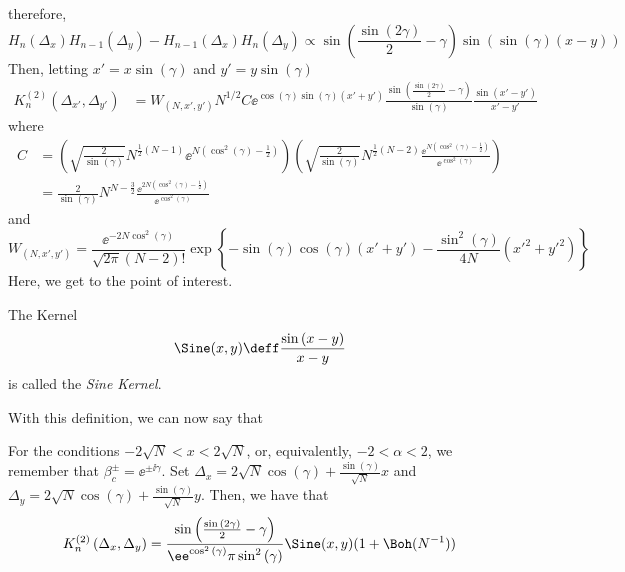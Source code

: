 {\begin{equation}
\end{equation}
therefore,
\begin{equation}
	H_n(\Delta_x)H_{n-1}(\Delta_y) - H_{n-1}(\Delta_x)H_n(\Delta_y) \propto \sin{\left(\frac{\sin{(2\gamma)}}{2}-\gamma\right)} \sin{\left( \sin{(\gamma)}(x - y) \right)}
\end{equation}
Then, letting $x' = x \sin{(\gamma)}$ and $y' = y \sin{(\gamma)}$
\begin{align}
	K_n^{(2)}(\Delta_{x'},\Delta_{y'}) & = W_{(N,x',y')} N^{1/2} C \ee^{\cos{(\gamma)}\sin{(\gamma)}(x' + y')} \frac{\sin{\left(\frac{\sin{(2\gamma)}}{2}-\gamma\right)} }{\sin{(\gamma)}}\frac{\sin{(x' - y')}}{x'-y'}
\end{align}
where
\begin{align}
	C & = \left(\sqrt{\frac{2}{\sin{(\gamma)}}}
	N^{\frac{1}{2}(N-1)}
	\ee^{N\left(\cos^2{(\gamma)} - \frac{1}{2} \right)} \right) 
	\left( \sqrt{\frac{2}{\sin{(\gamma)}}} 
	N^{\frac{1}{2}(N-2)}
	\frac{\ee^{N\left(\cos^2{(\gamma)} - \frac{1}{2} \right)}}{\ee^{\cos^2{(\gamma)} }}
	\right) \\
	& = \frac{2}{\sin{(\gamma)}}
	N^{N - \frac{3}{2}}
	\frac{\ee^{2N\left(\cos^2{(\gamma)} - \frac{1}{2} \right)}}{\ee^{\cos^2{(\gamma)}}}
\end{align}
and
\begin{equation}
	W_{(N,x',y')} = \frac{\ee^{-2N\cos^2{(\gamma)}}}{\sqrt{2\pi} (N-2)!}
	\exp{\left\{-\sin{(\gamma)}\cos{(\gamma)} (x'+y') - \frac{\sin^2{(\gamma)}}{4N} (x'^2 + y'^2) \right\}} 
\end{equation}
Here, we get to the point of interest. 
\begin{definicao}
	The Kernel
	\begin{equation}
		\Sine(x, y) \deff \frac{\sin{(x  -y)}}{x - y}
	\end{equation}
	is called the \textit{Sine Kernel}.
\end{definicao}
With this definition, we can now say that 
\begin{teorema}
	For the conditions $-2\sqrt{N} < x < 2\sqrt{N}$, or, equivalently, $-2 < \alpha < 2$, we remember that $\beta_c^\pm = \ee^{\pm \ii \gamma}$. Set $\Delta_x = 2\sqrt{N}\cos(\gamma) + \frac{\sin{(\gamma)}}{\sqrt{N}} x$ and $\Delta_y = 2\sqrt{N}\cos(\gamma) + \frac{\sin{(\gamma)}}{\sqrt{N}} y$. Then, we have that
	\begin{equation}
		K_n^{(2)}\left(\Delta_x, \Delta_y\right) = \frac{\sin{\left(\frac{\sin{(2\gamma)}}{2}-\gamma\right)}}{\ee^{\cos^2{(\gamma)}} \pi \sin^2{(\gamma)}} \Sine(x, y) (1 + \Boh(N^{-1}))
	\end{equation}
\end{teorema}

}
